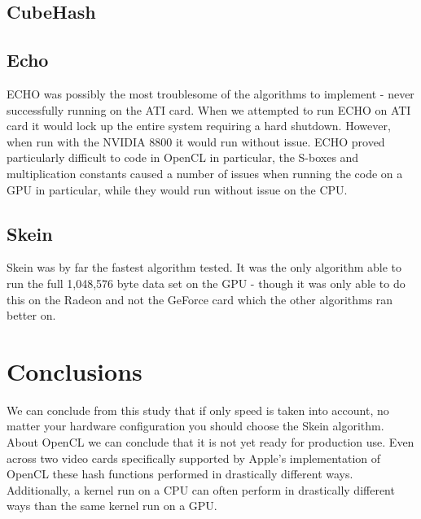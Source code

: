 \documentclass{article}
\begin{document}
\subsection*{CubeHash}

\subsection*{Echo}
ECHO was possibly the most troublesome of the algorithms to implement - never successfully running on the ATI card.  
When we attempted to run ECHO on ATI card it would lock up the entire system requiring a hard shutdown. 
However, when run with the NVIDIA 8800 it would run without issue.
ECHO proved particularly difficult to code in OpenCL in particular, the S-boxes and multiplication constants caused a number of issues when running the code on a GPU in particular, while they would run without issue on the CPU.

\subsection*{Skein}
Skein was by far the fastest algorithm tested.
It was the only algorithm able to run the full 1,048,576 byte data set on the GPU - though it was only able to do this on the Radeon and not the GeForce card which the other algorithms ran better on.

\section*{Conclusions}

We can conclude from this study that if only speed is taken into account, no matter your hardware configuration you should choose the Skein algorithm.
About OpenCL we can conclude that it is not yet ready for production use.
Even across two video cards specifically supported by Apple's implementation of OpenCL these hash functions performed in drastically different ways.
Additionally, a kernel run on a CPU can often perform in drastically different ways than the same kernel run on a GPU.
\end{document}
